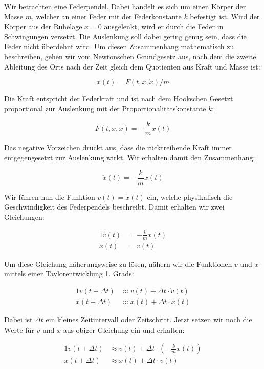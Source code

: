 Wir betrachten eine Federpendel. Dabei handelt es sich um einen Körper der Masse $m$, welcher an einer Feder mit der Federkonstante $k$ befestigt ist. Wird der Körper aus der Ruhelage $x=0$ ausgelenkt, wird er durch die Feder in Schwingungen versetzt. Die Auslenkung soll dabei gering genug sein, dass die Feder nicht überdehnt wird. Um diesen Zusammenhang mathematisch zu beschreiben, gehen wir vom Newtonschen Grundgesetz aus, nach dem die zweite Ableitung des Orts nach der Zeit gleich dem Quotienten aus Kraft und Masse ist:

$$
    \ddot{x}(t) = F(t,x,\dot{x}) / m
$$

Die Kraft entspricht der Federkraft und ist nach dem Hookschen Gesetzt proportional zur Auslenkung mit der Proportionalitätskonstante $k$:

$$
    F(t,x,\dot{x}) = -\frac{k}{m} x(t)
$$

Das negative Vorzeichen drückt aus, dass die rücktreibende Kraft immer entgegengesetzt zur Auslenkung wirkt. Wir erhalten damit den Zusammenhang:

$$
    \ddot{x}(t) = -\frac{k}{m} x(t)
$$

Wir führen nun die Funktion $v(t) = \dot{x}(t)$ ein, welche physikalisch die Geschwindigkeit des Federpendels beschreibt. Damit erhalten wir zwei Gleichungen:

\begin{alignat*}{1}
    \dot{v}(t) &= -\frac{k}{m}x(t) \\
    \dot{x}(t) &= v(t)
\end{alignat*}

Um diese Gleichung näherungsweise zu lösen, nähern wir die Funktionen $v$ und $x$ mittels einer Taylorentwicklung 1. Grads:

\begin{alignat*}{1}
    v(t + \Delta t) &\approx v(t) + \Delta t \cdot \dot{v}(t) \\
    x(t + \Delta t) &\approx x(t) + \Delta t \cdot \dot{x}(t)
\end{alignat*}

Dabei ist $\Delta t$ ein kleines Zeitintervall oder Zeitschritt. Jetzt setzen wir noch die Werte für $\dot{v}$ und $\dot{x}$ aus obiger Gleichung ein und erhalten:

\begin{alignat*}{1}
    v(t + \Delta t) &\approx v(t) + \Delta t \cdot \left(-\frac{k}{m}x(t)\right) \\
    x(t + \Delta t) &\approx x(t) + \Delta t \cdot v(t)
\end{alignat*}

